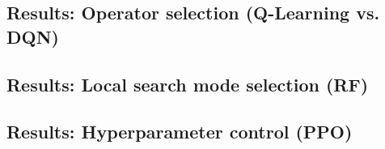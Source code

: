 \documentclass[preprint,12pt]{elsarticle}
\begin{document}

\subsection{Results: Operator selection (Q-Learning vs. DQN)}


\subsection{Results: Local search mode selection (RF)}


\subsection{Results: Hyperparameter control (PPO)}

\end{document}

